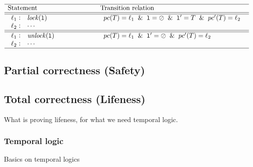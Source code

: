 \begin{description}
		\[
			\begin{array}[t]{p{8em}@{\hspace{6em}}p{\longtablesize}}
				\hline
				Statement & Transition relation \\ \hline\hline
				$\begin{array}[t]{l@{\hspace{0.3em}}c@{\hspace{1em}}l}
					\ell_1 & : & \mathtt{\fLock(l)} \\
					\ell_2 & : & \mathtt{\cdots}
				\end{array}$
				&
				$\begin{array}[t]{ll}
					\pc(T) = \ell_1 \And
						\mathtt{l} = \oslash \And
						\mathtt{l}' = T \And \pc'(T) = \ell_2
				 \end{array}$ \\ \hline\hline
				$\begin{array}[t]{l@{\hspace{0.3em}}c@{\hspace{1em}}l}
					\ell_1 & : & \mathtt{\fUnlock(l)} \\
					\ell_2 & : & \mathtt{\cdots}
				\end{array}$
				&
				$\begin{array}[t]{ll}
					\pc(T) = \ell_1 \And
						\mathtt{l}' = \oslash \And \pc'(T) = \ell_2
				 \end{array}$ \\ \hline
			 \end{array}
		\]

\end{description}

\subsection{Partial correctness (Safety)}



\subsection{Total correctness (Lifeness)}

What is proving lifeness, for what we need temporal logic.

\subsubsection{Temporal logic}

Basics on temporal logics

